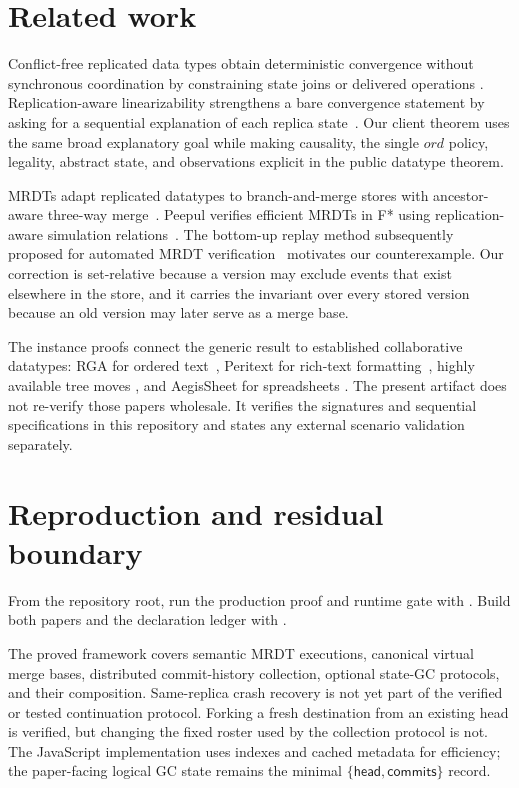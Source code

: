 \section{Related work}

Conflict-free replicated data types obtain deterministic convergence without
synchronous coordination by constraining state joins or delivered operations
\cite{shapiro2011crdt}. Replication-aware linearizability strengthens a bare
convergence statement by asking for a sequential explanation of each replica
state~\cite{wang2019ralin}. Our client theorem uses the same broad explanatory
goal while making causality, the single $ord$ policy, legality, abstract state,
and observations explicit in the public datatype theorem.

MRDTs adapt replicated datatypes to branch-and-merge stores with ancestor-aware
three-way merge~\cite{kaki2019mrdt}. Peepul verifies efficient MRDTs in F* using
replication-aware simulation relations~\cite{soundarapandian2022certified}.
The bottom-up replay method subsequently proposed for automated MRDT
verification~\cite{soundarapandian2025automatic} motivates our counterexample.
Our correction is set-relative because a version may exclude events that exist
elsewhere in the store, and it carries the invariant over every stored version
because an old version may later serve as a merge base.

The instance proofs connect the generic result to established collaborative
datatypes: RGA for ordered text~\cite{roh2011rga}, Peritext for rich-text
formatting~\cite{litt2022peritext}, highly available tree moves
\cite{kleppmann2022treemove}, and AegisSheet for spreadsheets
\cite{pfeil2026aegissheet}. The present artifact does not re-verify those
papers wholesale. It verifies the signatures and sequential specifications in
this repository and states any external scenario validation separately.

\section{Reproduction and residual boundary}

From the repository root, run the production proof and runtime gate with
. Build both papers and the declaration
ledger with .

The proved framework covers semantic MRDT executions, canonical virtual merge bases,
distributed commit-history collection, optional state-GC protocols, and their
composition. Same-replica crash recovery is not yet part of the verified or
tested continuation protocol. Forking a fresh destination from an existing
head is verified, but changing the fixed roster used by the collection
protocol is not. The JavaScript implementation uses indexes and cached metadata for efficiency; the
paper-facing logical GC state remains the minimal
$\{\mathsf{head},\mathsf{commits}\}$ record.

